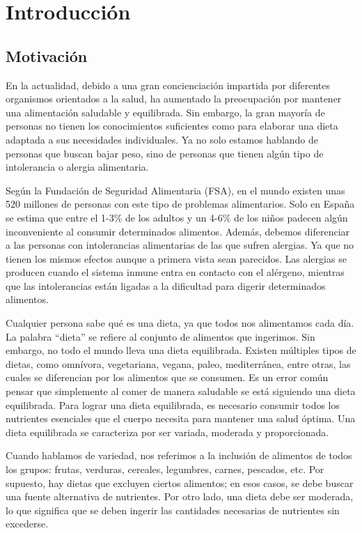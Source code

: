 \chapter{Introducción}

\section{Motivación}
En la \gls{actualidad}, debido a una gran concienciación impartida por diferentes organismos orientados a la salud, ha aumentado la preocupación por mantener una alimentación saludable y equilibrada. Sin embargo, la gran mayoría de personas no tienen los conocimientos suficientes como para elaborar una dieta adaptada a sus necesidades individuales. Ya no solo estamos hablando de personas que buscan bajar peso, sino de personas que tienen algún tipo de intolerancia o alergia alimentaria.

Según la Fundación de Seguridad Alimentaria (FSA), en el mundo existen unas 520 millones de personas con este tipo de problemas alimentarios. Solo en España se estima que entre el 1-3\% de los adultos y un 4-6\% de los niños padecen algún inconveniente al consumir determinados alimentos. Además, debemos diferenciar a las personas con intolerancias alimentarias de las que sufren alergias. Ya que no tienen los mismos efectos aunque a primera vista sean parecidos. Las alergias se producen cuando el sistema inmune entra en contacto con el alérgeno, mientras que las intolerancias están ligadas a la dificultad para digerir determinados alimentos.\cite{FSA}

Cualquier persona sabe qué es una dieta, ya que todos nos alimentamos cada día. La palabra ``dieta'' se refiere al conjunto de alimentos que ingerimos. Sin embargo, no todo el mundo lleva una dieta equilibrada. Existen múltiples tipos de dietas, como omnívora, vegetariana, vegana, paleo, mediterránea, entre otras, las cuales se diferencian por los alimentos que se consumen.
Es un error común pensar que simplemente al comer de manera saludable se está siguiendo una dieta equilibrada. Para lograr una dieta equilibrada, es necesario consumir todos los nutrientes esenciales que el cuerpo necesita para mantener una salud óptima. Una dieta equilibrada se caracteriza por ser variada, moderada y proporcionada.

Cuando hablamos de variedad, nos referimos a la inclusión de alimentos de todos los grupos: frutas, verduras, cereales, legumbres, carnes, pescados, etc. Por supuesto, hay dietas que excluyen ciertos alimentos; en esos casos, se debe buscar una fuente alternativa de nutrientes. Por otro lado, una dieta debe ser moderada, lo que significa que se deben ingerir las cantidades necesarias de nutrientes sin excederse.

